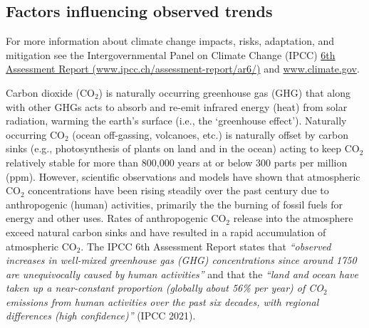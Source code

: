 \documentclass[
]{article}
\begin{document}
\hypertarget{factors-influencing-observed-trends}{%
\subsection{Factors influencing observed
trends}\label{factors-influencing-observed-trends}}

For more information about climate change impacts, risks, adaptation,
and mitigation see the Intergovernmental Panel on Climate Change (IPCC)
\href{https://www.ipcc.ch/assessment-report/ar6/}{6th Assessment Report
(www.ipcc.ch/assessment-report/ar6/)} and \url{www.climate.gov}.

Carbon dioxide (CO\(_2\)) is naturally occurring greenhouse gas (GHG)
that along with other GHGs acts to absorb and re-emit infrared energy
(heat) from solar radiation, warming the earth's surface (i.e., the
`greenhouse effect'). Naturally occurring CO\(_2\) (ocean off-gassing,
volcanoes, etc.) is naturally offset by carbon sinks (e.g.,
photosynthesis of plants on land and in the ocean) acting to keep
CO\(_2\) relatively stable for more than 800,000 years at or below 300
parts per million (ppm). However, scientific observations and models
have shown that atmospheric CO\(_2\) concentrations have been rising
steadily over the past century due to anthropogenic (human) activities,
primarily the the burning of fossil fuels for energy and other uses.
Rates of anthropogenic CO\(_2\) release into the atmosphere exceed
natural carbon sinks and have resulted in a rapid accumulation of
atmospheric CO\(_2\). The IPCC 6th Assessment Report states that
\emph{``observed increases in well-mixed greenhouse gas (GHG)
concentrations since around 1750 are unequivocally caused by human
activities''} and that the \emph{``land and ocean have taken up a
near-constant proportion (globally about 56\% per year) of CO\(_2\)
emissions from human activities over the past six decades, with regional
differences (high confidence)''} (IPCC 2021).
\end{document}
